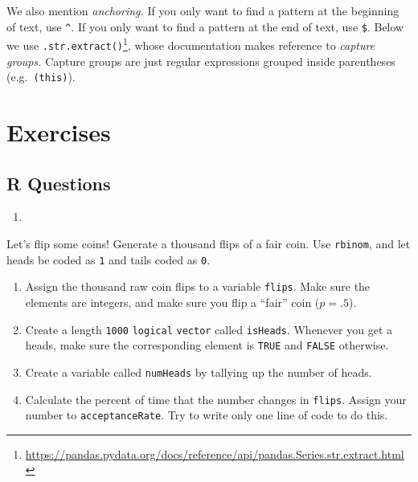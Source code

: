 \documentclass[
  12pt,
  krantz2]{krantz}
\makeatletter
\newenvironment{Shaded}{\begin{snugshade}}{\end{snugshade}}
\newcommand{\BuiltInTok}[1]{#1}
\newcommand{\CommentTok}[1]{\textcolor[rgb]{0.37,0.37,0.37}{\textit{#1}}}
\newcommand{\NormalTok}[1]{#1}
\newcommand{\OperatorTok}[1]{\textcolor[rgb]{0.43,0.43,0.43}{\textbf{#1}}}
\newcommand{\StringTok}[1]{\textcolor[rgb]{0.5,0.5,0.5}{#1}}
\newcommand{\VerbatimStringTok}[1]{\textcolor[rgb]{0.5,0.5,0.5}{#1}}
\providecommand{\tightlist}{%
  \setlength{\itemsep}{0pt}\setlength{\parskip}{0pt}}
\renewcommand{\href}[2]{#2\footnote{\url{#1}}}
\newenvironment{kframe}{%
\medskip{}
\setlength{\fboxsep}{.8em}
 \def\at@end@of@kframe{}%
 \ifinner\ifhmode%
  \def\at@end@of@kframe{\end{minipage}}%
  \begin{minipage}{\columnwidth}%
 \fi\fi%
 \def\FrameCommand##1{\hskip\@totalleftmargin \hskip-\fboxsep
 \colorbox{shadecolor}{##1}\hskip-\fboxsep
     \hskip-\linewidth \hskip-\@totalleftmargin \hskip\columnwidth}%
 \MakeFramed {\advance\hsize-\width
   \@totalleftmargin\z@ \linewidth\hsize
   \@setminipage}}%
 {\par\unskip\endMakeFramed%
 \at@end@of@kframe}
\renewenvironment{Shaded}{\begin{kframe}}{\end{kframe}}
\makeatother
\begin{document}
We also mention \emph{anchoring.} If you only want to find a pattern at the beginning of text, use \texttt{\^{}}. If you only want to find a pattern at the end of text, use \texttt{\$}. Below we use \href{https://pandas.pydata.org/docs/reference/api/pandas.Series.str.extract.html}{\texttt{.str.extract()}}, whose documentation makes reference to \emph{capture groups.} Capture groups are just regular expressions grouped inside parentheses (e.g.~\texttt{(this)}).

\begin{Shaded}
\end{Shaded}

\hypertarget{exercises-1}{%
\section{Exercises}\label{exercises-1}}

\hypertarget{r-questions-1}{%
\subsection{R Questions}\label{r-questions-1}}

\begin{enumerate}
\def\labelenumi{\arabic{enumi}.}
\tightlist
\item
\end{enumerate}

Let's flip some coins! Generate a thousand flips of a fair coin. Use \texttt{rbinom}, and let heads be coded as \texttt{1} and tails coded as \texttt{0}.

\begin{enumerate}
\def\labelenumi{\alph{enumi})}
\tightlist
\item
  Assign the thousand raw coin flips to a variable \texttt{flips}. Make sure the elements are integers, and make sure you flip a ``fair'' coin (\(p=.5\)).
\item
  Create a length \texttt{1000} \texttt{logical} \texttt{vector} called \texttt{isHeads}. Whenever you get a heads, make sure the corresponding element is \texttt{TRUE} and \texttt{FALSE} otherwise.
\item
  Create a variable called \texttt{numHeads} by tallying up the number of heads.
\item
  Calculate the percent of time that the number changes in \texttt{flips}. Assign your number to \texttt{acceptanceRate}. Try to write only one line of code to do this.
\end{enumerate}
\end{document}
